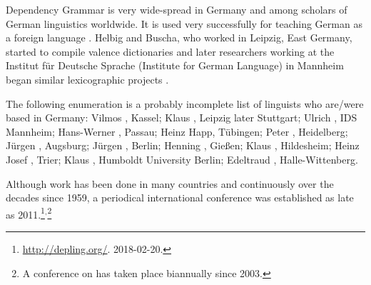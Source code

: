 Dependency Grammar is very wide-spread in Germany and among scholars of German linguistics
worldwide. It is used very successfully for teaching German as a foreign language
\citep{HB69a-u,HB98a}. Helbig and Buscha, who worked in Leipzig, East Germany, started to
compile valence dictionaries \citep{HS69a-u} and later researchers working at the Institut für
Deutsche Sprache (Institute for German Language) in Mannheim began similar lexicographic projects \citep{SKSR2004a-u}. 

The following enumeration is a probably incomplete list of linguists who are/were based in Germany: 
Vilmos \citet{Agel2000a-u}, Kassel; 
Klaus \citet{Baumgaertner65a-u,Baumgaertner70a}, Leipzig later Stuttgart;
Ulrich \citet{Engel77,Engel2014a}, IDS Mannheim; 
Hans-Werner \citet{Eroms85a,Eroms87b-u,Eroms2000a}, Passau; 
Heinz Happ, Tübingen;
Peter \citet{Hellwig78a-u,Hellwig2003a}, Heidelberg;
Jürgen \citet{Heringer96a-u}, Augsburg; 
Jürgen \citet{Kunze68a-u,Kunze75a-u}, Berlin;
Henning \citet{Lobin93a-u}, Gießen;
Klaus \citet{Schubert87a-u}, Hildesheim;
Heinz Josef \citet{Weber97a}, Trier;
Klaus \citet{Welke88a-u,Welke2011a-u}, Humboldt University Berlin;
Edeltraud \citet{Werner93a-u}, Halle-Wittenberg.

Although work has been done in many countries and continuously over the decades since 1959, a
periodical international conference was established as late as 2011.\footnote{%
  \href{http://depling.org/}{http://depling.org/}. 2018-02-20.
}$^,$\footnote{%
  A conference on \mtt has taken place biannually since 2003.
}

